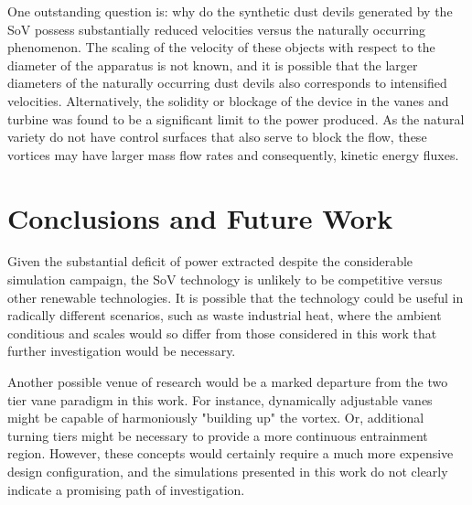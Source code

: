 



One outstanding question is: why do the synthetic dust devils generated by
the SoV possess substantially reduced velocities versus the naturally
occurring phenomenon. The scaling of the velocity of these objects with
respect to the diameter of the apparatus is not known, and it is
possible that the larger diameters of the naturally occurring dust
devils also corresponds to intensified velocities. Alternatively,
the solidity or blockage of the device in the vanes and turbine was
found to be a significant limit to the power produced. As the natural
variety do not have control surfaces that also serve to block the flow,
these vortices may have larger mass flow rates and consequently, 
kinetic energy fluxes.  
 
\section{Conclusions and Future Work}

Given the substantial deficit of power extracted despite the considerable
simulation campaign, the SoV technology is unlikely to be competitive 
versus other renewable technologies. 
It is possible that the technology could be useful in radically different scenarios, 
such as waste industrial heat, where the ambient conditious and scales 
would so differ from those considered in this work that further investigation 
would be necessary. 

Another possible venue of research would be a marked departure from the two tier 
vane paradigm in this work. For instance, dynamically adjustable vanes might be capable of 
harmoniously "building up" the vortex. Or, additional turning tiers might be necessary to 
provide a more continuous entrainment region. %
However, these concepts would certainly require a much more expensive design configuration, 
and the simulations presented in this work do not clearly indicate a promising 
path of investigation. 

